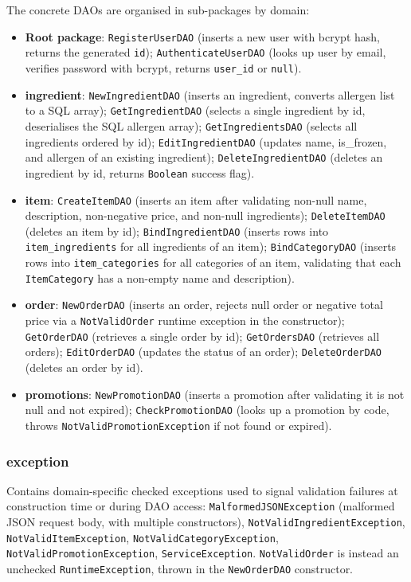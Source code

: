 The concrete DAOs are organised in sub-packages by domain:
\begin{itemize}
    \item \textbf{Root package}: \texttt{RegisterUserDAO} (inserts a new user with bcrypt hash, returns the generated \texttt{id}); \texttt{AuthenticateUserDAO} (looks up user by email, verifies password with bcrypt, returns \texttt{user\_id} or \texttt{null}).
    \item \textbf{ingredient}: \texttt{NewIngredientDAO} (inserts an ingredient, converts allergen list to a SQL array); \texttt{GetIngredientDAO} (selects a single ingredient by id, deserialises the SQL allergen array); \texttt{GetIngredientsDAO} (selects all ingredients ordered by id); \texttt{EditIngredientDAO} (updates name, is\_frozen, and allergen of an existing ingredient); \texttt{DeleteIngredientDAO} (deletes an ingredient by id, returns \texttt{Boolean} success flag).
    \item \textbf{item}: \texttt{CreateItemDAO} (inserts an item after validating non-null name, description, non-negative price, and non-null ingredients); \texttt{DeleteItemDAO} (deletes an item by id); \texttt{BindIngredientDAO} (inserts rows into \texttt{item\_ingredients} for all ingredients of an item); \texttt{BindCategoryDAO} (inserts rows into \texttt{item\_categories} for all categories of an item, validating that each \texttt{ItemCategory} has a non-empty name and description).
    \item \textbf{order}: \texttt{NewOrderDAO} (inserts an order, rejects null order or negative total price via a \texttt{NotValidOrder} runtime exception in the constructor); \texttt{GetOrderDAO} (retrieves a single order by id); \texttt{GetOrdersDAO} (retrieves all orders); \texttt{EditOrderDAO} (updates the status of an order); \texttt{DeleteOrderDAO} (deletes an order by id).
    \item \textbf{promotions}: \texttt{NewPromotionDAO} (inserts a promotion after validating it is not null and not expired); \texttt{CheckPromotionDAO} (looks up a promotion by code, throws \texttt{NotValidPromotionException} if not found or expired).
\end{itemize}
 
\subsubsection{exception}
Contains domain-specific checked exceptions used to signal validation failures at construction time or during DAO access: \texttt{MalformedJSONException} (malformed JSON request body, with multiple constructors), \texttt{NotValidIngredientException}, \texttt{NotValidItemException}, \texttt{NotValidCategoryException}, \texttt{NotValidPromotionException}, \texttt{ServiceException}. \texttt{NotValidOrder} is instead an unchecked \texttt{RuntimeException}, thrown in the \texttt{NewOrderDAO} constructor.
 
